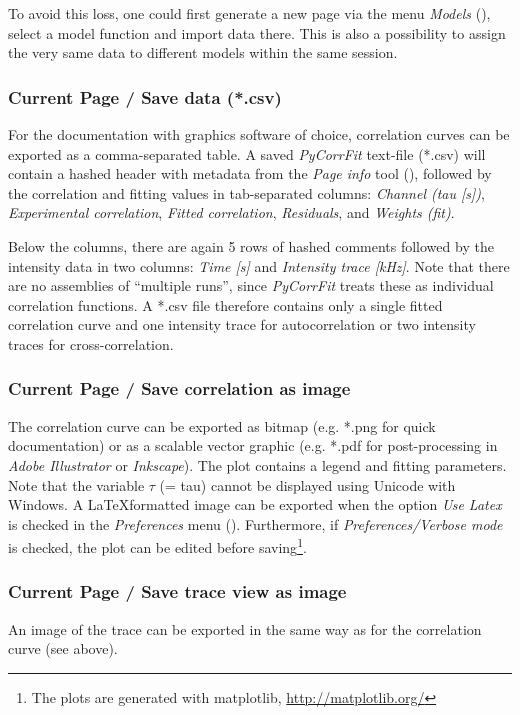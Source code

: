 To avoid this loss, one could first generate a new page via the menu \textit{Models} (), select a model function and import data there. This is also a possibility to assign the very same data to different models within the same session.

\subsubsection{Current Page / Save data (*.csv)}
\label{sec:menub.curre.saved}
For the documentation with graphics software of choice, correlation curves can be exported as a comma-separated table. A saved \textit{PyCorrFit} text-file (*.csv) will contain a hashed header with metadata from the \textit{Page info} tool (), followed by the correlation and fitting values in tab-separated columns: \textit{Channel (tau [s])}, \textit{Experimental correlation}, \textit{Fitted correlation}, \textit{Residuals}, and \textit{Weights (fit)}. 

Below the columns, there are again 5 rows of hashed comments followed by the intensity data in two columns: \textit{Time [s]} and \textit{Intensity trace [kHz]}. Note that there are no assemblies of ``multiple runs'', since \textit{PyCorrFit} treats these as individual correlation functions. A *.csv file therefore contains only a single fitted correlation curve and one intensity trace for autocorrelation or two intensity traces for cross-correlation.

\subsubsection{Current Page / Save correlation as image}
\label{sec:menub.curre.savec}
The correlation curve can be exported as bitmap (e.g. *.png for quick documentation) or as a scalable vector graphic (e.g. *.pdf for post-processing in \textit{Adobe Illustrator} or \textit{Inkscape}). The plot contains a legend and fitting parameters. Note that the variable $\tau$ (= tau) cannot be displayed using Unicode with Windows. A \LaTeX formatted image can be exported when the option \textit{Use Latex} is checked in the \textit{Preferences} menu (). Furthermore, if \textit{Preferences/Verbose mode} is checked, the plot can be edited before saving\footnote{The plots are generated with matplotlib, \url{http://matplotlib.org/}}. 

\subsubsection{Current Page / Save trace view as image}
\label{sec:menub.curre.savet}
An image of the trace can be exported in the same way as for the correlation curve (see above). 

